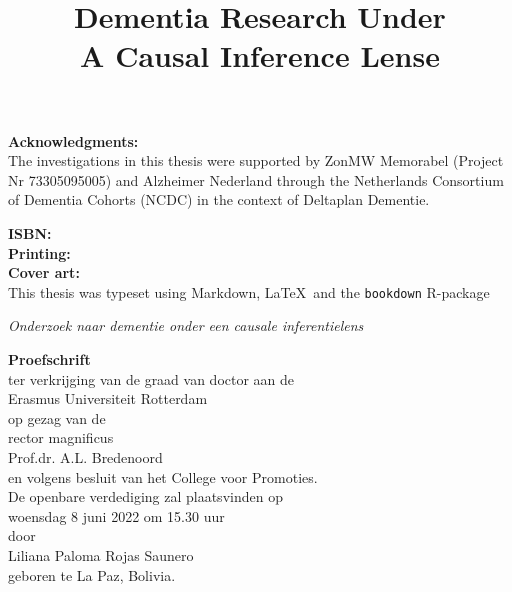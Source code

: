 \thispagestyle{empty}
\vspace*{\fill}
\small

\textbf{Acknowledgments:} \\
The investigations in this thesis were supported by
ZonMW Memorabel (Project Nr 73305095005) and 
Alzheimer Nederland through the Netherlands Consortium of Dementia Cohorts (NCDC) 
in the context of Deltaplan Dementie. 

\textbf{ISBN:} \\
\textbf{Printing:} \\  
\textbf{Cover art:} \\

This thesis was typeset using Markdown, \LaTeX\ and the \verb+bookdown+ R-package

\newpage
\thispagestyle{empty}
\begin{center}
\vspace{20mm}

\title{\textbf{\Large Dementia Research Under \\ \vspace{5mm} A Causal Inference Lense}}

\textit{\large Onderzoek naar dementie onder een causale inferentielens}

\vspace{10mm}
\textbf{\large{Proefschrift}}\\
\vspace{10mm}
ter verkrijging van de graad van doctor aan de\\
Erasmus Universiteit Rotterdam\\
op gezag van de\\
rector magnificus\\
\vspace{10mm}
Prof.dr. A.L. Bredenoord\\
\vspace{10mm}
en volgens besluit van het College voor Promoties.\\
De openbare verdediging zal plaatsvinden op\\
\vspace{10mm}
woensdag 8 juni 2022 om 15.30 uur\\
\vspace{10mm}
door\\
\vspace{10mm}
Liliana Paloma Rojas Saunero\\
geboren te La Paz, Bolivia. 
\end{center}

